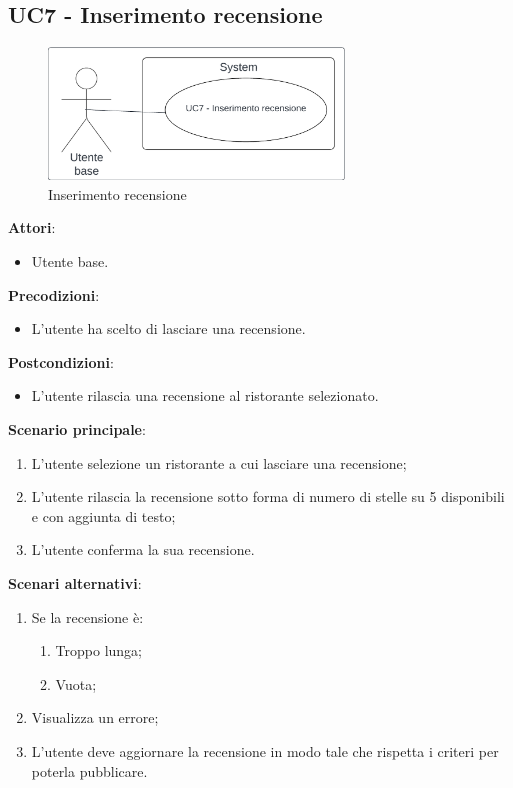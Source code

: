 \subsection{UC7 - Inserimento recensione}\label{usecase:7}
\begin{figure}[H]
  \centering
  \includegraphics[width=0.7\textwidth]{ucd/UCD7.png}
  \caption{Inserimento recensione}
\end{figure}
\textbf{Attori}:
\begin{itemize}
    \item Utente base.
\end{itemize}
\textbf{Precodizioni}:
\begin{itemize}
    \item L'utente ha scelto di lasciare una recensione.
\end{itemize}
\textbf{Postcondizioni}:
\begin{itemize}
    \item L'utente rilascia una recensione al ristorante selezionato.
\end{itemize}
\textbf{Scenario principale}:
\begin{enumerate}
    \item L'utente selezione un ristorante a cui lasciare una recensione;
    \item L'utente rilascia la recensione sotto forma di numero di stelle su 5 disponibili e con aggiunta di testo;
    \item L'utente conferma la sua recensione.
\end{enumerate}
\textbf{Scenari alternativi}:
\begin{enumerate}
    \item Se la recensione è:
    \begin{enumerate}
        \item Troppo lunga;
        \item Vuota;
    \end{enumerate}
    \item Visualizza un errore;
    \item L'utente deve aggiornare la recensione in modo tale che rispetta i criteri per poterla pubblicare.
\end{enumerate}
\newpage